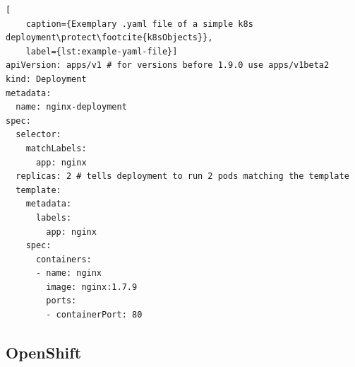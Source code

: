 \begin{lstlisting}[
	caption={Exemplary .yaml file of a simple k8s deployment\protect\footcite{k8sObjects}},
	label={lst:example-yaml-file}]
apiVersion: apps/v1 # for versions before 1.9.0 use apps/v1beta2
kind: Deployment
metadata:
  name: nginx-deployment
spec:
  selector:
    matchLabels:
      app: nginx
  replicas: 2 # tells deployment to run 2 pods matching the template
  template:
    metadata:
      labels:
        app: nginx
    spec:
      containers:
      - name: nginx
        image: nginx:1.7.9
        ports:
        - containerPort: 80
\end{lstlisting}


\subsection{OpenShift} \label{openshiftExplanation}

